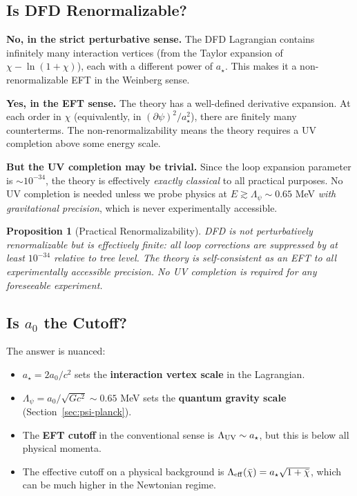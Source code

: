 \documentclass[11pt,a4paper]{article}
\newtheorem{proposition}{Proposition}
\begin{document}
\subsection{Is DFD Renormalizable?}
\label{sec:renormalizable}

\textbf{No, in the strict perturbative sense.} The DFD Lagrangian contains infinitely many interaction vertices (from the Taylor expansion of $\chi - \ln(1+\chi)$), each with a different power of $a_\star$. This makes it a non-renormalizable EFT in the Weinberg sense.

\textbf{Yes, in the EFT sense.} The theory has a well-defined derivative expansion. At each order in $\chi$ (equivalently, in $(\partial\psi)^2/a_\star^2$), there are finitely many counterterms. The non-renormalizability means the theory requires a UV completion above some energy scale.

\textbf{But the UV completion may be trivial.} Since the loop expansion parameter is $\sim 10^{-34}$, the theory is effectively \emph{exactly classical} to all practical purposes. No UV completion is needed unless we probe physics at $E \gtrsim \Lambda_\psi \sim 0.65$ MeV \emph{with gravitational precision}, which is never experimentally accessible.

\begin{proposition}[Practical Renormalizability]
DFD is not perturbatively renormalizable but is effectively finite: all loop corrections are suppressed by at least $10^{-34}$ relative to tree level. The theory is self-consistent as an EFT to all experimentally accessible precision. No UV completion is required for any foreseeable experiment.
\end{proposition}

\subsection{Is $a_0$ the Cutoff?}
\label{sec:a0-cutoff}

The answer is nuanced:
\begin{itemize}
\item $a_\star = 2a_0/c^2$ sets the \textbf{interaction vertex scale} in the Lagrangian.
\item $\Lambda_\psi = a_0/\sqrt{Gc^2} \sim 0.65$ MeV sets the \textbf{quantum gravity scale} (Section~\ref{sec:psi-planck}).
\item The \textbf{EFT cutoff} in the conventional sense is $\Lambda_{\rm UV} \sim a_\star$, but this is below all physical momenta.
\item The effective cutoff on a physical background is $\Lambda_{\rm eff}(\bar\chi) = a_\star\sqrt{1+\bar\chi}$, which can be much higher in the Newtonian regime.
\end{itemize}
\end{document}
